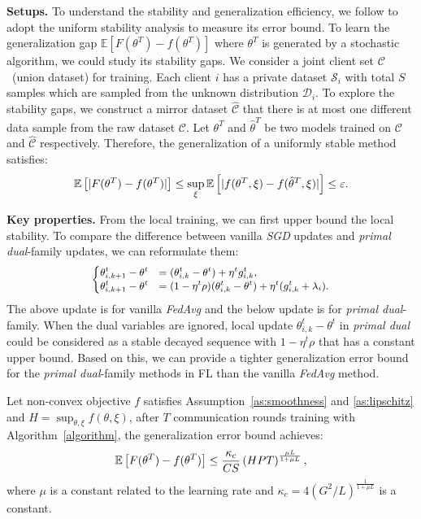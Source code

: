 \textbf{Setups.} To understand the stability and generalization efficiency, we follow \citet{hardt2016train,lei2020fine,zhou2021towards,sun2023understanding} to adopt the uniform stability analysis to measure its error bound. To learn the generalization gap $\mathbb{E}\left[F(\theta^T)-f(\theta^T)\right]$ where $\theta^T$ is generated by a stochastic algorithm, we could study its stability gaps. We consider a joint client set $\mathcal{C}$~(union dataset) for training. Each client $i$ has a private dataset $\mathcal{S}_i$ with total $S$ samples which are sampled from the unknown distribution $\mathcal{D}_i$. To explore the stability gaps, we construct a mirror dataset $\hat{\mathcal{C}}$ that there is at most one different data sample from the raw dataset $\mathcal{C}$. Let $\theta^T$ and $\hat{\theta}^T$ be two models trained on $\mathcal{C}$ and $\hat{\mathcal{C}}$ respectively.
Therefore, the generalization of a uniformly stable method satisfies:
\begin{equation}
    \label{stability}
    \small
    \mathbb{E}\left[\vert F(\theta^T)-f(\theta^T)\vert \right]\leq\sup_{\xi}\mathbb{E}\left[\vert f(\theta^T,\xi) - f(\hat{\theta}^T,\xi)\vert\right]\leq \varepsilon.
\end{equation}

\textbf{Key properties.} From the local training, we can first upper bound the local stability. To compare the difference between vanilla \textit{SGD} updates and \textit{primal dual}-family updates, we can reformulate them:
\begin{eqnarray}
\label{local_iteration}
\small
\begin{cases}
\theta_{i,k+1}^{t}-\theta^t &= (\theta_{i,k}^{t}-\theta^t) + \eta^t g_{i,k}^t, \\
\theta_{i,k+1}^{t}-\theta^t &= (1 - \eta^t\rho)(\theta_{i,k}^{t}-\theta^t) + \eta^t(g_{i,k}^t + \lambda_i).
\end{cases}
\end{eqnarray}
The above update is for vanilla \textit{FedAvg} and the below update is for \textit{primal dual}-family. When the dual variables are ignored, local update $\theta_{i,k}^t-\theta^t$ in \textit{primal dual} could be considered as a stable decayed sequence with $1-\eta^t\rho$ that has a constant upper bound. Based on this, we can provide a tighter generalization error bound for the \textit{primal dual}-family methods in FL than the vanilla \textit{FedAvg} method.

\begin{theorem}
    Let non-convex objective $f$ satisfies Assumption~\ref{as:smoothness} and \ref{as:lipschitz} and $H=\sup_{\theta,\xi} f(\theta,\xi)$, after $T$ communication rounds training with Algorithm~\ref{algorithm}, the generalization error bound achieves:
    \begin{equation}
    \small
    \mathbb{E}\left[F(\theta^T)-f(\theta^T)\right] \leq \frac{\kappa_c}{CS}\left(HPT\right)^{\frac{\mu L}{1+\mu L}},
    \end{equation}
    where $\mu$ is a constant related to the learning rate and $\kappa_c = 4\left(G^2/L\right)^{\frac{1}{1+\mu L}}$ is a constant.
\end{theorem}

